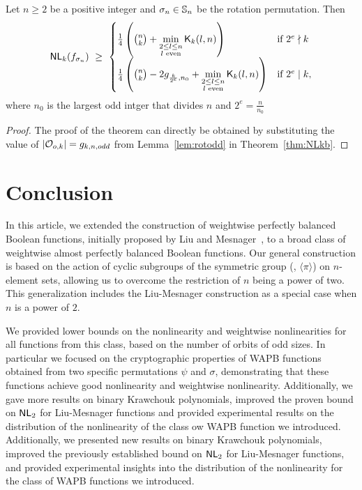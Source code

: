 \documentclass{llncs}
\begin{document}
\begin{theorem}\label{thm:NLkb_sigma}
Let $n \geq 2$ be a positive integer and $\sigma_n \in \mathbb{S}_n$ be the rotation permutation.
Then $$\mathsf{NL}_{k}(f_{\sigma_n}) ~\geq ~
\begin{cases}
\frac{1}{4}\left({n \choose k} + \min\limits_{\substack{2 \leq l \leq n \\ l \text{ even}}} \mathsf{K}_{k}(l,n)\right) & \text{if } 2^e \nmid k \\
\frac{1}{4}\left({n \choose k} - 2g_{\frac{k}{2^e},n_0} + \min\limits_{\substack{2 \leq l \leq n \\ l \text{ even}}} \mathsf{K}_{k}(l,n)\right) & \text{if } 2^e \mid k,
\end{cases}$$
where $n_0$ is the largest odd intger that divides $n$ and $2^e = \frac{n}{n_0}$
\end{theorem}
\begin{proof} The proof of the theorem can directly be obtained by substituting the value of $|\mathcal{O}_{o,k}| = g_{k,n,odd}$ from Lemma~\ref{lem:rotodd} in Theorem~\ref{thm:NLkb}.
\end{proof}

\section{Conclusion}\label{sec:con}


In this article, we extended the construction of weightwise perfectly balanced Boolean functions, initially proposed by Liu and Mesnager~\cite{DCC:LiuMes19}, to a broad class of weightwise almost perfectly balanced Boolean functions. 
Our general construction is based on the action of cyclic subgroups of the symmetric group (\ie, $\langle \pi \rangle$) on $n$-element sets, allowing us to overcome the restriction of $n$ being a power of two. 
This generalization includes the Liu-Mesnager construction as a special case when $n$ is a power of $2$.

We provided lower bounds on the nonlinearity and weightwise nonlinearities for all functions from this class, based on the number of orbits of odd sizes. 
In particular we focused on the cryptographic properties of WAPB functions obtained from two specific permutations $\psi$ and $\sigma$, demonstrating that these functions achieve good nonlinearity and weightwise nonlinearity. 
Additionally, we gave more results on binary Krawchouk polynomials, improved the proven bound on $\mathsf{NL}_{2}$ for Liu-Mesnager functions and provided experimental results on the distribution of the nonlinearity of the class ow WAPB function we introduced.
Additionally, we presented new results on binary Krawchouk polynomials, improved the previously established bound on $\mathsf{NL}_{2}$ for Liu-Mesnager functions, and provided experimental insights into the distribution of the nonlinearity for the class of WAPB functions we introduced.
\end{document}
